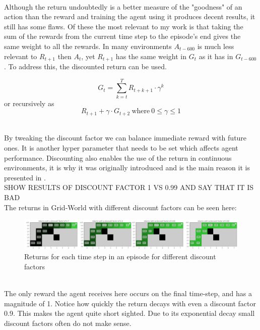\noindent
\\ Although the return undoubtedly is a better measure of the "goodness" of an action than the reward and training the agent using it produces decent results, it still has some flaws. Of these the most relevant to my work is that taking the sum of the rewards from the current time step to the episode's end gives the same weight to all the rewards. In many environments $A_{t-600}$ is much less relevant to $R_{t+1}$ then $A_t$, yet $R_{t+1}$ has the same weight in $G_{t}$ as it has in $G_{t-600}$. To address this, the discounted return can be used. 

\begin{equation}\label{MDP:discounted_return}
    G_t = \sum_{k=t}^{T} R_{t+k+1} \cdot \gamma ^k 
\end{equation}
or recursively as
\begin{equation}\label{MDP:recursive_discounted_return}
    R_{t+1} + \gamma \cdot G_{t+2} \mathrm{\ where\ } 0 \leq \gamma \leq 1
\end{equation}
\centerline{\small{}}

\noindent
\\ By tweaking the discount factor we can balance immediate reward with future ones. It is another hyper parameter that needs to be set which affects agent performance. Discounting also enables the use of the return in continuous environments, it is why it was originally introduced and is the main reason it is presented in \cite{sutton_reinforcement_2018}. {\\ \color{red} SHOW RESULTS OF DISCOUNT FACTOR 1 VS 0.99 AND SAY THAT IT IS BAD} \\ The returns in Grid-World with different discount factors can be seen here:

\begin{figure}[h!]
    \centering
    \includegraphics[width=\linewidth]{figures/grid_world_discount_factors.png}
    \caption{Returns for each time step in an episode for different discount factors}
    \label{fig:grid_world_discount_factors}
\end{figure}

\noindent
\\ The only reward the agent receives here occurs on the final time-step, and has a magnitude of 1. Notice how quickly the return decays with even a discount factor 0.9. This makes the agent quite short sighted. Due to its exponential decay small discount factors often do not make sense.

